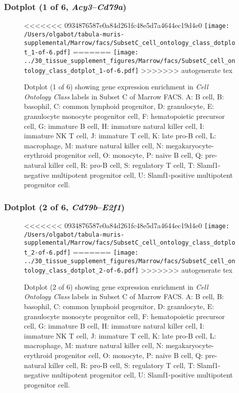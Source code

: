\clearpage

\subsubsection{Dotplot (1 of 6, \emph{Acy3}--\emph{Cd79a})}
\begin{figure}[h]
\centering
<<<<<<< 0934876587e0a84d261fc48e5d7a4644ec19d4e0
\texttt{[image: /Users/olgabot/tabula-muris-supplemental/Marrow/facs/SubsetC\_cell\_ontology\_class\_dotplot\_1-of-6.pdf]}
=======
\texttt{[image: ../30\_tissue\_supplement\_figures/Marrow/facs/SubsetC\_cell\_ontology\_class\_dotplot\_1-of-6.pdf]}
>>>>>>> autogenerate tex

\caption{ Dotplot (1 of 6)  showing gene expression enrichment in \emph{Cell Ontology Class} labels in Subset C of Marrow FACS. A: B cell, B: basophil, C: common lymphoid progenitor, D: granulocyte, E: granulocyte monocyte progenitor cell, F: hematopoietic precursor cell, G: immature B cell, H: immature natural killer cell, I: immature NK T cell, J: immature T cell, K: late pro-B cell, L: macrophage, M: mature natural killer cell, N: megakaryocyte-erythroid progenitor cell, O: monocyte, P: naive B cell, Q: pre-natural killer cell, R: pro-B cell, S: regulatory T cell, T: Slamf1-negative multipotent progenitor cell, U: Slamf1-positive multipotent progenitor cell.}
\end{figure}


\clearpage

\subsubsection{Dotplot (2 of 6, \emph{Cd79b}--\emph{E2f1})}
\begin{figure}[h]
\centering
<<<<<<< 0934876587e0a84d261fc48e5d7a4644ec19d4e0
\texttt{[image: /Users/olgabot/tabula-muris-supplemental/Marrow/facs/SubsetC\_cell\_ontology\_class\_dotplot\_2-of-6.pdf]}
=======
\texttt{[image: ../30\_tissue\_supplement\_figures/Marrow/facs/SubsetC\_cell\_ontology\_class\_dotplot\_2-of-6.pdf]}
>>>>>>> autogenerate tex

\caption{ Dotplot (2 of 6)  showing gene expression enrichment in \emph{Cell Ontology Class} labels in Subset C of Marrow FACS. A: B cell, B: basophil, C: common lymphoid progenitor, D: granulocyte, E: granulocyte monocyte progenitor cell, F: hematopoietic precursor cell, G: immature B cell, H: immature natural killer cell, I: immature NK T cell, J: immature T cell, K: late pro-B cell, L: macrophage, M: mature natural killer cell, N: megakaryocyte-erythroid progenitor cell, O: monocyte, P: naive B cell, Q: pre-natural killer cell, R: pro-B cell, S: regulatory T cell, T: Slamf1-negative multipotent progenitor cell, U: Slamf1-positive multipotent progenitor cell.}
\end{figure}


